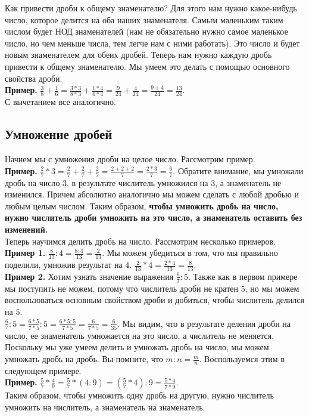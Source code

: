 \documentclass{article}
\begin{document}
Как привести дроби к общему знаменателю? Для этого нам нужно какое-нибудь число, которое делится на оба наших знаменателя. Самым маленьким таким числом будет НОД знаменателей (нам не обязательно нужно самое маленькое число, но чем меньше числа, тем легче нам с ними работать). Это число и будет новым знаменателем для обеих дробей. Теперь нам нужно каждую дробь привести к общему знаменателю. Мы умеем это делать с помощью основного свойства дроби.\\

\textbf{Пример.} $\frac38 + \frac16 = \frac{3*3}{8*3} + \frac{1*4}{6*4} = \frac9{24} + \frac4{24} = \frac{9+4}{24} = \frac{13}{24}$.\\
С вычетанием все аналогично.

\subsection{Умножение дробей}
Начнем мы с умножения дроби на целое число. Рассмотрим пример.\\
\textbf{Пример.} $\frac27 * 3 = \frac27 + \frac27 + \frac27 = \frac{2+2+2}7 = \frac{2*3}7 = \frac67$.
Обратите внимание, мы умножали дробь на число $3$, в результате числитель умножился на $3$, а знаменатель не изменился. Причем абсолютно аналогично мы можем сделать с любой дробью и любым целым числом. Таким образом, \textbf{чтобы умножить дробь на число, нужно числитель дроби умножить на это число, а знаменатель оставить без изменений.}\\

Теперь научимся делить дробь на число. Рассмотрим несколько примеров.\\
\textbf{Пример 1.} $\frac8{13} : 4 = \frac{8:4}{13} = \frac2{13}$. Мы можем убедиться в том, что мы правильно поделили, умножив результат на $4$. $\frac2{13} * 4 = \frac{2*4}{13} = \frac8{13}$.\\
\textbf{Пример 2.} Хотим узнать значение выражения $\frac67 : 5$. Также как в первом примере мы поступить не можем, потому что числитель дроби не кратен $5$, но мы можем воспользоваться основным свойством дроби и добиться, чтобы числитель делился на $5$.\\
$\frac67 : 5 = \frac{6*5}{7*5} : 5 = \frac{6*5:5}{7*5} = \frac6{7*5} = \frac6{35}$. Мы видим, что в результате деления дроби на число, ее знаменатель умножается на это число, а числитель не меняется.\\

Поскольку мы уже умеем делить и умножать дробь на число, мы можем умножать дробь на дробь. Вы помните, что $m:n = \frac mn$. Воспользуемся этим в следующем примере.\\
\textbf{Пример.} $\frac57 * \frac49 = \frac57 * (4:9) = (\frac57 *4 ) : 9 = \frac{5*4}{7*9}$. \\
Таким образом, чтобы умножить одну дробь на другую, нужно числитель умножить на числитель, а знаменатель на знаменатель.
\end{document}
